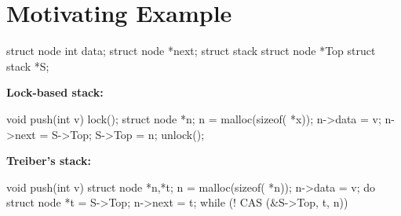 
\section{Motivating Example}\label{sec:motivation}

\begin{figure*}[t]
\lstset{numbers=left, 
            numberstyle=\tiny\tt, 
            stepnumber=1, 
            firstnumber=1,
            numbersep=4pt}
{\footnotesize

\begin{minipage}{14cm}
\begin{minipage}{3.7cm}
\begin{program}
struct node {
	int data;
	struct node *next;
}
struct stack {
	struct node *Top
}
struct stack *S;
\end{program}
\end{minipage}
\begin{minipage}{4.7cm}
{\bf Lock-based stack:}
\begin{program}
void push(int v) {
	lock();
	struct node *n;
	n = malloc(sizeof( *x));
	n->data = v;
	n->next = S->Top;
	S->Top = n;
	unlock();
}
\end{program}
\end{minipage}
\begin{minipage}{6cm}
{\bf Treiber's stack:}
\begin{program}
void push(int v) {
	struct node *n,*t;
	n = malloc(sizeof( *n));
	n->data = v;
	do {
		struct node *t = S->Top;
		n->next = t;
	} while (! CAS (&S->Top, t, n))
}
\end{program}
\end{minipage}


\end{minipage}}
\end{figure*}
